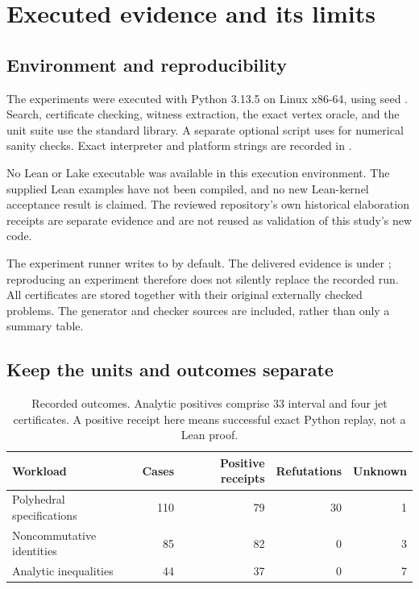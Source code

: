 \section{Executed evidence and its limits}
\label{sec:evidence}

\subsection{Environment and reproducibility}
The experiments were executed with Python 3.13.5 on Linux x86-64, using seed . Search, certificate checking, witness extraction, the exact vertex oracle, and the unit suite use the standard library. A separate optional script uses  for numerical sanity checks. Exact interpreter and platform strings are recorded in .

No Lean or Lake executable was available in this execution environment. The supplied Lean examples have not been compiled, and no new Lean-kernel acceptance result is claimed. The reviewed repository's own historical elaboration receipts are separate evidence and are not reused as validation of this study's new code.

The experiment runner writes to  by default. The delivered evidence is under ; reproducing an experiment therefore does not silently replace the recorded run. All certificates are stored together with their original externally checked problems. The generator and checker sources are included, rather than only a summary table.

\subsection{Keep the units and outcomes separate}
\begin{table}[ht]
\centering
\begin{tabular}{@{}lrrrr@{}}
\toprule
Workload & Cases & Positive receipts & Refutations & Unknown \\
\midrule
Polyhedral specifications & 110 & 79 & 30 & 1 \\
Noncommutative identities & 85 & 82 & 0 & 3 \\
Analytic inequalities & 44 & 37 & 0 & 7 \\
\bottomrule
\end{tabular}
\caption{Recorded outcomes. Analytic positives comprise 33 interval and four jet certificates. A positive receipt here means successful exact Python replay, not a Lean proof.}
\end{table}

